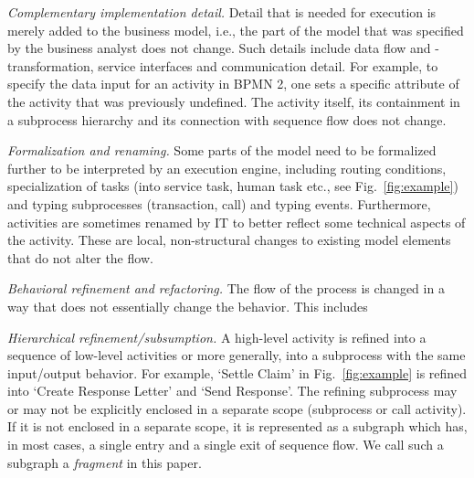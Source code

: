 {\small
\begin{itemize*}
%
	\item \emph{Complementary implementation detail.} Detail that is needed for execution is merely added to the business model, i.e., the part of the model that was specified by the business analyst does not change. Such details include data flow and -transformation, service interfaces and communication detail. For example, to specify the data input for an activity in BPMN 2, one sets a specific attribute of the activity that was previously undefined. The activity itself, its containment in a subprocess hierarchy and its connection with sequence flow does not change.
%	
	\item \emph{Formalization and renaming.} Some parts of the model need to be formalized further to be interpreted by an execution engine, including routing conditions, specialization of tasks (into service task, human task etc., see Fig.~\ref{fig:example}) and typing subprocesses (transaction, call) and typing events. Furthermore, activities are sometimes renamed by IT to better reflect some technical aspects of the activity. These are local, non-structural changes to existing model elements that do not alter the flow.
%	
	\item \emph{Behavioral refinement and refactoring.} The flow of the process is changed in a way that does not essentially change the behavior. This includes
	\begin{itemize*}
	  \item \emph{Hierarchical refinement/subsumption.} A high-level activity is refined into a sequence of low-level activities or more generally, into a subprocess with the same input/output behavior. For example, `Settle Claim' in Fig.~\ref{fig:example} is refined into `Create Response Letter' and `Send Response'. The refining subprocess may or may not be explicitly enclosed in a separate scope (subprocess or call activity). If it is not enclosed in a separate scope, it is represented as a subgraph which has, in most cases, a single entry and a single exit of sequence flow. We call such a subgraph a \emph{fragment} in this paper.
	 

\end{itemize*}
\end{itemize*}}
